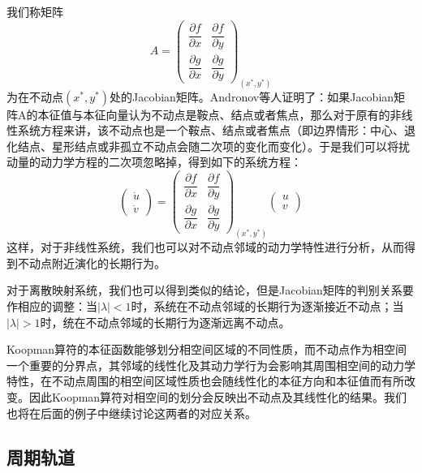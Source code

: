 我们称矩阵
\begin{equation}
    A=\begin{pmatrix}
        \dfrac{\partial f}{\partial x} & \dfrac{\partial f}{\partial y} \\
        \dfrac{\partial g}{\partial x} & \dfrac{\partial g}{\partial y}
    \end{pmatrix}_{(x^*,y^*)}
\end{equation}
为在不动点$(x^*,y^*)$处的Jacobian矩阵。Andronov等人证明了\cite{andronov1973qualitative}：如果Jacobian矩阵A的本征值与本征向量认为不动点是鞍点、结点或者焦点，那么对于原有的非线性系统方程来讲，该不动点也是一个鞍点、结点或者焦点（即边界情形：中心、退化结点、星形结点或非孤立不动点会随二次项的变化而变化）。于是我们可以将扰动量的动力学方程的二次项忽略掉，得到如下的系统方程：
\begin{equation}
    \begin{pmatrix}
        \dot{u}\\
        \dot{v}
    \end{pmatrix}=
    \begin{pmatrix}
        \dfrac{\partial f}{\partial x} & \dfrac{\partial f}{\partial y} \\
        \dfrac{\partial g}{\partial x} & \dfrac{\partial g}{\partial y}
    \end{pmatrix}_{(x^*,y^*)}
    \begin{pmatrix}
        u\\v
    \end{pmatrix}
\end{equation}
这样，对于非线性系统，我们也可以对不动点邻域的动力学特性进行分析，从而得到不动点附近演化的长期行为。

对于离散映射系统，我们也可以得到类似的结论，但是Jacobian矩阵的判别关系要作相应的调整：当$|\lambda|<1$时，系统在不动点邻域的长期行为逐渐接近不动点；当$|\lambda|>1$时，统在不动点邻域的长期行为逐渐远离不动点。

Koopman算符的本征函数能够划分相空间区域的不同性质\cite{JJY2015Koopman}，而不动点作为相空间一个重要的分界点，其邻域的线性化及其动力学行为会影响其周围相空间的动力学特性，在不动点周围的相空间区域性质也会随线性化的本征方向和本征值而有所改变。因此Koopman算符对相空间的划分会反映出不动点及其线性化的结果。我们也将在后面的例子中继续讨论这两者的对应关系。

\subsection{周期轨道}

